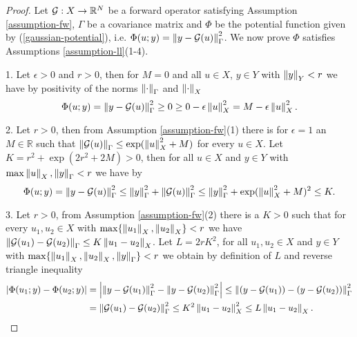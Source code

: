 \begin{proof}
  Let $\mathcal{G} : X \rightarrow \mathbb{R}^N$ be a forward operator satisfying Assumption \ref{assumption-fw}, $\Gamma$ be a covariance matrix and $\Phi$ be the potential function given by (\ref{gaussian-potential}), i.e. $\Phi(u; y) = \left\lVert y - \mathcal{G}(u)\right\rVert_\Gamma^2$. We now prove $\Phi$ satisfies Assumptions \ref{assumption-ll}(1-4).

  1. Let $\epsilon > 0$ and $r > 0$, then for $M = 0$ and all $u \in X$, $y \in Y$ with $\left\lVert y\right\rVert_Y < r$ we have by positivity of the norms $\left\lVert\cdot\right\rVert_\Gamma$ and $\left\lVert\cdot\right\rVert_X$
  \begin{equation*}
    \Phi(u; y) = \left\lVert y - \mathcal{G}(u)\right\rVert_\Gamma^2 \ge 0 \ge 0 - \epsilon\left\lVert u\right\rVert_X^2 = M - \epsilon\left\lVert u\right\rVert_X^2.
  \end{equation*}

  2. Let $r > 0$, then from Assumption \ref{assumption-fw}(1) there is for $\epsilon = 1$ an $M \in \mathbb{R}$ such that $\left\lVert\mathcal{G}(u)\right\rVert_\Gamma \le \exp(\left\lVert u\right\rVert_X^2 + M)$ for every $u \in X$. Let $K = r^2 + \exp(2r^2 + 2M) > 0$, then for all $u \in X$ and $y \in Y$ with $\max{\left\lVert u\right\rVert_X, \left\lVert y\right\rVert_\Gamma} < r$ we have by
  \begin{equation*}
    \Phi(u; y) = \left\lVert y - \mathcal{G}(u)\right\rVert_\Gamma^2 \le \left\lVert y\right\rVert_\Gamma^2 + \left\lVert\mathcal{G}(u)\right\rVert_\Gamma^2 \le \left\lVert y\right\rVert_\Gamma^2 + \exp(\left\lVert u\right\rVert_X^2 + M)^2 \le  K.
  \end{equation*}

  3. Let $r > 0$, from Assumption \ref{assumption-fw}(2) there is a $K > 0$ such that for every $u_1, u_2 \in X$ with $\max\{\left\lVert u_1\right\rVert_X, \left\lVert u_2\right\rVert_X\} < r$ we have $\left\lVert\mathcal{G}(u_1) - \mathcal{G}(u_2)\right\rVert_\Gamma \le K\left\lVert u_1 - u_2\right\rVert_X$. Let $L = 2rK^2$, for all $u_1, u_2 \in X$ and $y \in Y$ with $\max\{\left\lVert u_1\right\rVert_X, \left\lVert u_2\right\rVert_X,\left\lVert y\right\rVert_\Gamma\} < r$ we obtain by definition of $L$ and reverse triangle inequality
  \begin{align*}
    |\Phi(u_1; y) - \Phi(u_2; y)|
    &= \left|\left\lVert y - \mathcal{G}(u_1)\right\rVert_\Gamma^2 - \left\lVert y - \mathcal{G}(u_2)\right\rVert_\Gamma^2\right|
    \le \left\lVert (y - \mathcal{G}(u_1)) - (y - \mathcal{G}(u_2))\right\rVert_\Gamma^2\\
    &= \left\lVert\mathcal{G}(u_1) - \mathcal{G}(u_2)\right\rVert_\Gamma^2 \le K^2\left\lVert u_1 - u_2\right\rVert_X^2 \le L\left\lVert u_1 - u_2\right\rVert_X.
  \end{align*}


\end{proof}
